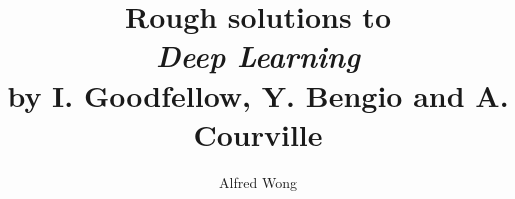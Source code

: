 \documentclass{article}
\title{Rough solutions to\\\textit{Deep Learning}\\by I. Goodfellow, Y. Bengio and A. Courville}
\author{Alfred Wong}
\date{\vspace{-\baselineskip}}
\begin{document}
\maketitle
\pagebreak
\tableofcontents
\pagebreak
\end{document}
